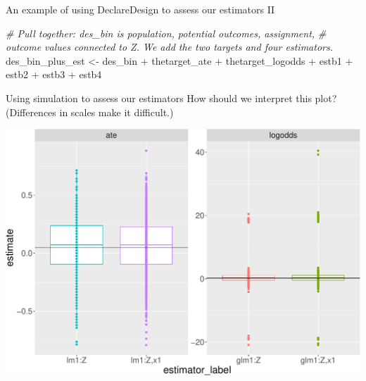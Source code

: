 \documentclass[
  ignorenonframetext,
]{beamer}
\newenvironment{Shaded}{\begin{snugshade}}{\end{snugshade}}
\newcommand{\CommentTok}[1]{\textcolor[rgb]{0.56,0.35,0.01}{\textit{#1}}}
\newcommand{\NormalTok}[1]{#1}
\newcommand{\OtherTok}[1]{\textcolor[rgb]{0.56,0.35,0.01}{#1}}
\newcommand{\SpecialCharTok}[1]{\textcolor[rgb]{0.00,0.00,0.00}{#1}}
\begin{document}
\begin{frame}[fragile]{An example of using DeclareDesign to assess our
estimators II}
\protect\hypertarget{an-example-of-using-declaredesign-to-assess-our-estimators-ii}{}
\scriptsize

\begin{Shaded}
\begin{Highlighting}[]
\CommentTok{\# Pull together: des\_bin is population, potential outcomes, assignment,}
\CommentTok{\# outcome values connected to Z.  We add the two targets and four estimators.}
\NormalTok{des\_bin\_plus\_est }\OtherTok{\textless{}{-}}\NormalTok{ des\_bin }\SpecialCharTok{+}\NormalTok{ thetarget\_ate }\SpecialCharTok{+}\NormalTok{ thetarget\_logodds }\SpecialCharTok{+}
\NormalTok{  estb1 }\SpecialCharTok{+}\NormalTok{ estb2 }\SpecialCharTok{+}\NormalTok{ estb3 }\SpecialCharTok{+}\NormalTok{ estb4}
\end{Highlighting}
\end{Shaded}

\normalsize

\scriptsize\normalsize
\end{frame}

\begin{frame}{Using simulation to assess our estimators}
\protect\hypertarget{using-simulation-to-assess-our-estimators}{}
How should we interpret this plot? (Differences in scales make it
difficult.)

\scriptsize

\includegraphics[width=.95\textwidth,]{figs/figsim_plot_bin-1}
\normalsize
\end{frame}
\end{document}
